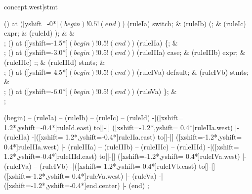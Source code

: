 

\begin{syntax}[[xshift=20mm]concept.west]{stmt}
  
  \node[sequence,column sep=1.2cm] () at ([yshift=-0*\syntaxruledist]$(begin)!0.5!(end)$) {
    \node[terminal]    (ruleIa) {switch};
    &
    \node[terminal]    (ruleIb) {(};
    &
    \node[nonterminal] (ruleIc) {expr};
    &
    \node[terminal]    (ruleId) {)};
    &
    &
    \\
  };
  \node[sequence,column sep=1.2cm] () at ([yshift=-1.5*\syntaxruledist]$(begin)!0.5!(end)$) {
    \node[terminal]    (ruleIIa) {\{};
    &
    \\
  };
  \node[sequence,column sep=1.2cm] () at ([yshift=-3.0*\syntaxruledist]$(begin)!0.5!(end)$) {
    \node[terminal]    (ruleIIIa) {case};
    &
    \node[nonterminal] (ruleIIIb) {expr};
    &
    \node[terminal]    (ruleIIIc) {:};
    &
    \node[nonterminal] (ruleIIId) {stmts};
    &
    \\
  };
  \node[sequence,column sep=1.2cm] () at ([yshift=-4.5*\syntaxruledist]$(begin)!0.5!(end)$) {
    \node[terminal]    (ruleIVa) {default};
    &
    \node[nonterminal] (ruleIVb) {stmts};
    &
    \\
  };
  \node[sequence,column sep=1.2cm] () at ([yshift=-6.0*\syntaxruledist]$(begin)!0.5!(end)$) {
    \node[terminal]    (ruleVa) {\}};
    &
    \\
  };
  
  \draw[path] (begin)
           -- (ruleIa)
           -- (ruleIb)
           -- (ruleIc)
           -- (ruleId)
           -|([xshift= 1.2*\syntaxruledist,yshift=-0.4*\syntaxruledist]ruleId.east)
           to[|-|] ([xshift=-1.2*\syntaxruledist,yshift= 0.4*\syntaxruledist]ruleIIa.west)
           |- (ruleIIa)
           -|([xshift= 1.2*\syntaxruledist,yshift=-0.4*\syntaxruledist]ruleIIa.east)
           to[|-|] ([xshift=-1.2*\syntaxruledist,yshift= 0.4*\syntaxruledist]ruleIIIa.west)
           |- (ruleIIIa)
           -- (ruleIIIb)
           -- (ruleIIIc)
           -- (ruleIIId)
           -|([xshift= 1.2*\syntaxruledist,yshift=-0.4*\syntaxruledist]ruleIIId.east)
           to[|-|] ([xshift=-1.2*\syntaxruledist,yshift= 0.4*\syntaxruledist]ruleIVa.west)
           |- (ruleIVa)
           -- (ruleIVb)
           -|([xshift= 1.2*\syntaxruledist,yshift=-0.4*\syntaxruledist]ruleIVb.east)
           to[|-|] ([xshift=-1.2*\syntaxruledist,yshift= 0.4*\syntaxruledist]ruleVa.west)
           |- (ruleVa)
           -|([xshift=-1.2*\syntaxruledist,yshift=-0.4*\syntaxruledist]end.center)
           |- (end)
  ;
  

\end{syntax}
